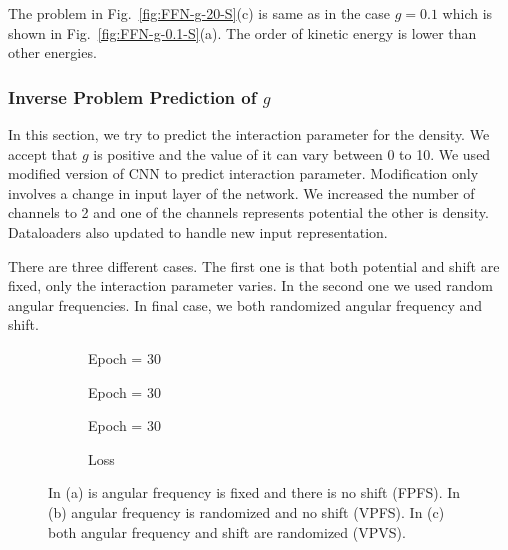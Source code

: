 \documentclass[a4paper,times,12pt]{article}
\begin{document}
The problem in Fig.~\ref{fig:FFN-g-20-S}(c) is same as in the case $g = 0.1$ which is shown in Fig.~\ref{fig:FFN-g-0.1-S}(a). The order of kinetic energy is  lower than other energies. 

\subsubsection{Inverse Problem Prediction of ${g}$}

In this section, we try to predict the interaction parameter for the density. We accept that $g$ is positive and the value of it can vary between 0 to 10. We used modified version of CNN to predict interaction parameter. Modification only involves a change in input layer of the network. We increased the number of channels to 2 and one of the channels represents potential the other is density. Dataloaders also updated to handle new input representation. 

There are three different cases. The first one is that both potential and shift are fixed, only the interaction parameter varies. In the second one we used random angular frequencies. In final case, we both randomized angular frequency and shift.


\begin{figure}[H]
    \centering
    \begin{subfigure}[t]{0.45\textwidth}
		\centering
    	
    	\caption{Epoch = 30}
		\label{fig:a}
    \end{subfigure}
    \begin{subfigure}[t]{0.45\textwidth}
        \centering
    	
    	\caption{Epoch = 30}
		\label{fig:b}
    \end{subfigure}
    \begin{subfigure}[t]{0.45\textwidth}
        \centering
		
    	\caption{Epoch = 30}
		\label{fig:c}
    \end{subfigure}
    \begin{subfigure}[t]{0.45\textwidth}
        \centering
		
    	\caption{Loss}
		\label{fig:d}
    \end{subfigure}

	\caption{In (a) is angular frequency is fixed and there is no shift (FPFS). In (b) angular frequency is randomized and no shift (VPFS). In (c) both angular frequency and shift are randomized (VPVS).}
\label{fig:FFN-g-pred}
\end{figure}
\end{document}
